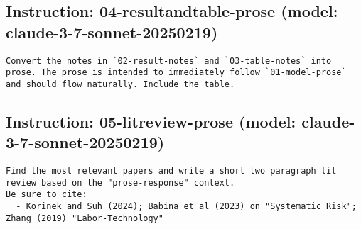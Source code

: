 \subsection*{Instruction: 04-resultandtable-prose  (model: claude-3-7-sonnet-20250219)}
\vspace{-1ex}
\begin{lstlisting}[language=text,breaklines=true,frame=single]
Convert the notes in `02-result-notes` and `03-table-notes` into prose. The prose is intended to immediately follow `01-model-prose` and should flow naturally. Include the table.

\end{lstlisting}
\vspace{-3ex}
\subsection*{Instruction: 05-litreview-prose  (model: claude-3-7-sonnet-20250219)}
\vspace{-1ex}
\begin{lstlisting}[language=text,breaklines=true,frame=single]
Find the most relevant papers and write a short two paragraph lit review based on the "prose-response" context. 
Be sure to cite:
  - Korinek and Suh (2024); Babina et al (2023) on "Systematic Risk"; Zhang (2019) "Labor-Technology"

\end{lstlisting}
\vspace{-3ex}
